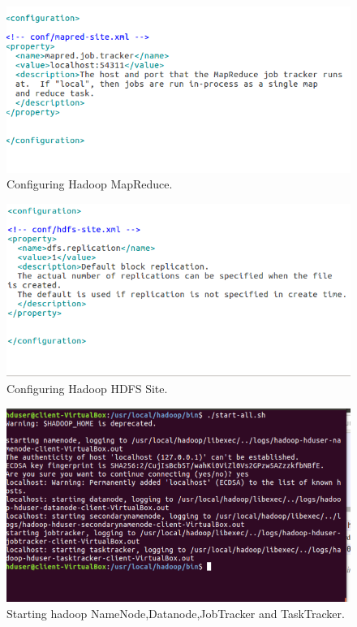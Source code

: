 \documentclass[a4paper,10pt]{article}
\begin{document}
	\begin{figure}[h]
		\includegraphics[scale=0.30,center]{exptFourScreenShot/fig8.png}
		\caption{Configuring Hadoop MapReduce.}
		\label{fig:8}
	\end{figure}
	
	\begin{figure}[h]
		\includegraphics[scale=0.30,center]{exptFourScreenShot/fig9.png}
		\caption{Configuring Hadoop HDFS Site.}
		\label{fig:9}
	\end{figure}

 \pagebreak

\begin{figure}[h]
	\includegraphics[scale=0.35,center]{exptFourScreenShot/startall.png}
	\caption{Starting hadoop NameNode,Datanode,JobTracker and TaskTracker.}
	\label{fig:11}
\end{figure}
\end{document}
